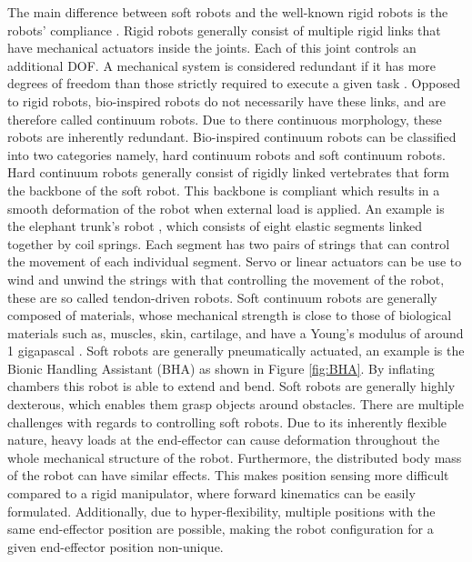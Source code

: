 The main difference between soft robots and the well-known rigid robots is the robots' compliance \cite{trivedi2008soft}. Rigid robots generally consist of multiple rigid links that have mechanical actuators inside the joints. Each of this joint controls an additional DOF. A mechanical system is considered redundant if it has more degrees of freedom than those strictly required to execute a given task \cite{chiaverini2016redundant}. Opposed to rigid robots, bio-inspired robots do not necessarily have these links, and are therefore called continuum robots. Due to there continuous morphology, these robots are inherently redundant. Bio-inspired continuum robots can be classified into two categories namely, hard continuum robots and soft continuum robots. Hard continuum robots
generally consist of rigidly linked vertebrates that form the backbone of the soft robot. This backbone is compliant which results in a smooth deformation of the robot when external load is applied. An example is the elephant trunk's robot \cite{cieslak1999elephant}, which consists of eight elastic segments linked together by coil springs. Each segment has two pairs of strings that can control the movement of each individual segment. Servo or linear actuators can be use to wind and unwind the strings with that controlling the movement of the robot, these are so called tendon-driven robots. Soft continuum robots are generally composed of materials, whose mechanical strength is close to those of biological materials such as, muscles, skin, cartilage, and have a Young's modulus of around 1 gigapascal \cite{rus2015design}. Soft robots are generally pneumatically actuated, an example is the Bionic Handling Assistant (BHA) \cite{rolf2012constant} as shown in Figure \ref{fig:BHA}. By inflating chambers this robot is able to extend and bend. Soft robots are generally highly dexterous, which enables them grasp objects around obstacles. There are multiple challenges with regards to controlling soft robots. Due to its inherently flexible nature, heavy loads at the end-effector can cause deformation throughout the whole mechanical structure of the robot. Furthermore, the distributed body mass of the robot can have similar effects. This makes position sensing more difficult compared to a rigid manipulator, where forward kinematics can be easily formulated. Additionally, due to hyper-flexibility, multiple positions with the same end-effector position are possible, making the robot configuration for a given end-effector position non-unique.





